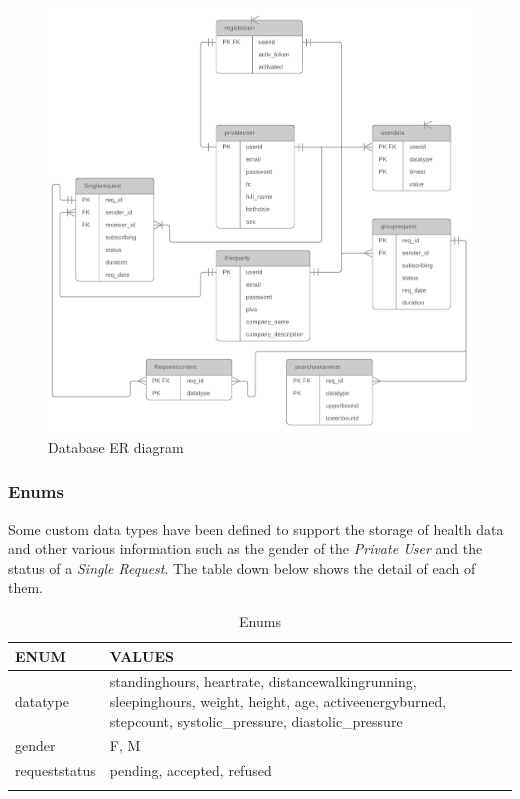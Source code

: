 \documentclass[titlepage]{article}
\begin{document}
	\begin{figure}[H]
		\flushleft
		\includegraphics[width=15cm]{DBModel.png}
		\caption{Database ER diagram}
		\label{fig:COMPDIA}
	\end{figure}
	
	
	\subsubsection{Enums}
	Some custom data types have been defined to support the storage of health data and other various information such as the gender of the {\it Private User} and the status of a {\it Single Request}. The table down below shows the detail of each of them.
	\begin{longtable}{| p{2 cm} | p{7 cm} |} \hline
		ENUM & VALUES \\ \hline
		datatype & standinghours, heartrate, distancewalkingrunning, sleepinghours, weight, height, age, activeenergyburned, stepcount, systolic\_pressure, diastolic\_pressure \\ \hline
		gender & F, M \\ \hline
		requeststatus & pending, accepted, refused\\ \hline
		\caption{Enums}	
	\end{longtable}
	
\end{document}
